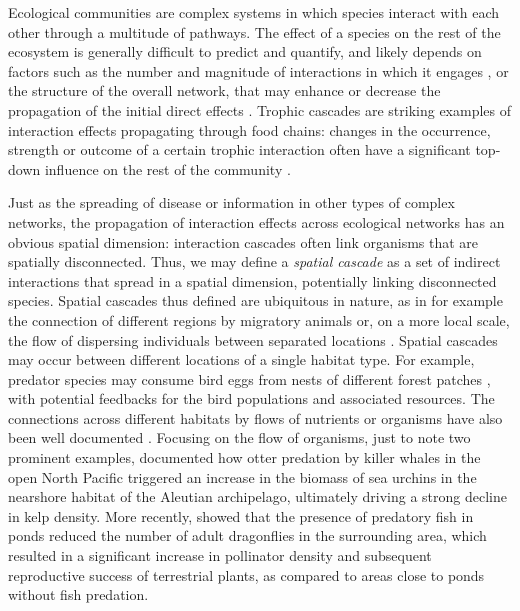 Ecological communities are complex systems in which species interact with each other through a multitude of pathways. The effect of a species on the rest of the ecosystem is generally difficult to predict and quantify, and likely depends on factors such as the number and magnitude of interactions in which it engages \citep{Zhao2016a}, or the structure of the overall network, that may enhance or decrease the propagation of the initial direct effects \citep{Polis1994}. Trophic cascades are striking examples of interaction effects propagating through food chains: changes in the occurrence, strength or outcome of a certain trophic interaction often have a significant top-down influence on the rest of the community \citep{Schmitz2000}.

Just as the spreading of disease \citep{Balcan2009} or information \citep{Barthelemy2011} in other types of complex networks, the propagation of interaction effects across ecological networks has an obvious spatial dimension: interaction cascades often link organisms that are spatially disconnected. Thus, we may define a \textit{spatial cascade} as a set of indirect interactions that spread in a spatial dimension, potentially linking disconnected species. Spatial cascades thus defined are ubiquitous in nature, as in for example the connection of different regions by migratory animals \citep{Springer2018} or, on a more local scale, the flow of dispersing individuals between separated locations \citep{Leibold2004}. Spatial cascades may occur between different locations of a single habitat type. For example, predator species may consume bird eggs from nests of different forest patches \citep{Chalfoun2002}, with potential feedbacks for the bird populations and associated resources. The connections across different habitats by flows of nutrients or organisms have also been well documented \citep{Polis1997}. Focusing on the flow of organisms, just to note two prominent examples, \cite{Estes1998} documented how otter predation by killer whales in the open North Pacific triggered an increase in the biomass of sea urchins in the nearshore habitat of the Aleutian archipelago, ultimately driving a strong decline in kelp density. More recently, \cite{Knight2005} showed that the presence of predatory fish in ponds reduced the number of adult dragonflies in the surrounding area, which resulted in a significant increase in pollinator density and subsequent reproductive success of terrestrial plants, as compared to areas close to ponds without fish predation.

